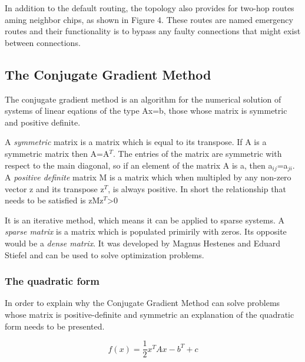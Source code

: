 \documentclass[12pt,a4paper]{article}
\begin{document}
In addition to the default routing, the topology also provides for two-hop routes aming neighbor chips, as shown in Figure 4. These routes are named emergency routes and their functionality is to bypass any faulty connections that might exist between connections.
\newpage
\subsection{The Conjugate Gradient Method}
The conjugate gradient method is an algorithm for the numerical solution of systems of linear eqations of the type Ax=b, those whose matrix is symmetric and positive definite. 

A \emph{symmetric} matrix is a matrix which is equal to its transpose. If A is a symmetric matrix then A=A$^T$. The entries of the matrix are symmetric with respect to the main diagonal, so if an element of the matrix A is a, then a$_{ij}$=a$_{ji}$. 
A \emph{positive definite} matrix M is a matrix which when multipled by any non-zero vector z and its transpose z$^T$, is always positive. In short the relationship that needs to be satisfied is zMz$^T$>0

It is an iterative method, which means it can be applied to sparse systems. A \emph{sparse matrix} is a matrix which is populated primirily with zeros. Its opposite would be a \emph{dense matrix}. It was developed by Magnus Hestenes and Eduard Stiefel and can be used to solve optimization problems\cite{press2007numerical}.
\subsubsection{The quadratic form}
In order to explain why the Conjugate Gradient Method can solve problems whose matrix is positive-definite and symmetric an explanation of the quadratic form needs to be presented.
\begin{center}
\begin{equation}
f(x)=\frac{1}{2}x^TAx-b^T+c
\end{equation}
\end{center}
\end{document}
